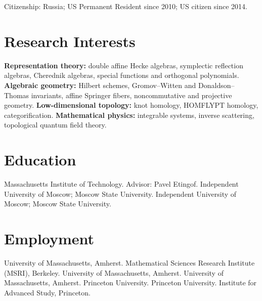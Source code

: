 \documentclass[11pt]{article}
\begin{document}
\thispagestyle{cvfirst}

\cvheader

Citizenship: Russia; US Permanent Resident since 2010; US citizen since 2014.

\section{Research Interests}

\textbf{Representation theory:} double affine Hecke algebras, symplectic
reflection algebras, Cherednik algebras, special functions and orthogonal
polynomials.
\textbf{Algebraic geometry:} Hilbert schemes, Gromov--Witten and
Donaldson--Thomas invariants, affine Springer fibers, noncommutative and
projective geometry.
\textbf{Low-dimensional topology:} knot homology, HOMFLYPT homology,
categorification.
\textbf{Mathematical physics:} integrable systems, inverse scattering,
topological quantum field theory.

\section{Education}

\begin{cventries}
    {Massachusetts Institute of Technology. Advisor: Pavel Etingof.}
    {Independent University of Moscow; Moscow State University.}
    {Independent University of Moscow; Moscow State University.}
\end{cventries}

\section{Employment}

\begin{cventries}
    {University of Massachusetts, Amherst.}
    {Mathematical Sciences Research Institute (MSRI), Berkeley.}
    {University of Massachusetts, Amherst.}
    {University of Massachusetts, Amherst.}
    {Princeton University.}
    {Princeton University.}
    {Institute for Advanced Study, Princeton.}
\end{cventries}
\end{document}
